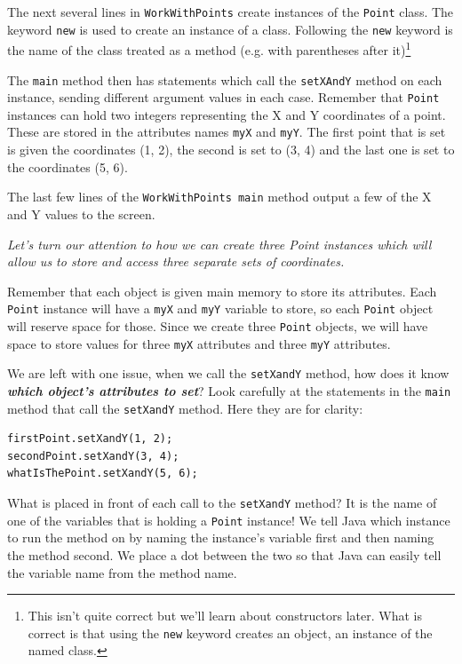 The next several lines in \texttt{WorkWithPoints} create instances of the \texttt{Point} class. The keyword \texttt{new} is used to create an instance of a class. Following the \texttt{new} keyword is the name of the class treated as a method (e.g. with parentheses after it)\footnote{This isn't quite correct but we'll learn about constructors later. What is correct is that using the \texttt{new} keyword creates an object, an instance of the named class.}

The \texttt{main} method then has statements which call the \texttt{setXAndY} method on each instance, sending different argument values in each case. Remember that \texttt{Point} instances can hold two integers representing the X and Y coordinates of a point. These are stored in the attributes names \texttt{myX} and \texttt{myY}. The first point that is set is given the coordinates (1, 2), the second is set to (3, 4) and the last one is set to the coordinates (5, 6).

The last few lines of the \texttt{WorkWithPoints main} method output a few of the X and Y values to the screen.

\textit{Let's turn our attention to how we can create three Point instances which will allow us to store and access three separate sets of coordinates.}

Remember that each object is given main memory to store its attributes. Each \texttt{Point} instance will have a \texttt{myX} and \texttt{myY} variable to store, so each \texttt{Point} object will reserve space for those. Since we create three \texttt{Point} objects, we will have space to store values for three \texttt{myX} attributes and three \texttt{myY} attributes.

We are left with one issue, when we call the \texttt{setXandY} method, how does it know \textbf{\textit{which object's attributes to set}}? Look carefully at the statements in the \texttt{main} method that call the \texttt{setXandY} method. Here they are for clarity:

\beforeverb
\begin{verbatim}
firstPoint.setXandY(1, 2);
secondPoint.setXandY(3, 4);
whatIsThePoint.setXandY(5, 6);
\end{verbatim}
\afterverb

What is placed in front of each call to the \texttt{setXandY} method? It is the name of one of the variables that is holding a \texttt{Point} instance! We tell Java which instance to run the method on by naming the instance's variable first and then naming the method second. We place a dot between the two so that Java can easily tell the variable name from the method name.


